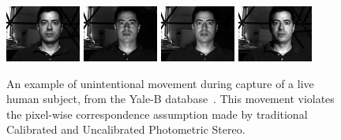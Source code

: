 \begin{figure}
    \hspace*{\fill}
    \includegraphics[width=0.22\textwidth]{collection_ps/images/yaleb/yaleB06_P00A+000E+20} \hfill
    \includegraphics[width=0.22\textwidth]{collection_ps/images/yaleb/yaleB06_P00A+000E-20} \hfill
    \includegraphics[width=0.22\textwidth]{collection_ps/images/yaleb/yaleB06_P00A+005E-10} \hfill
    \includegraphics[width=0.22\textwidth]{collection_ps/images/yaleb/yaleB06_P00A-020E+10}
    \hspace*{\fill}
\label{fig:yaleb_movement_example}
    \caption{An example of unintentional movement during capture of a live
             human subject, from the Yale-B database~\cite{georghiades2001fromfew}.
             This movement violates the pixel-wise correspondence assumption
             made by traditional Calibrated and Uncalibrated Photometric
             Stereo.}
\end{figure}


\stopcontents[chapters]
